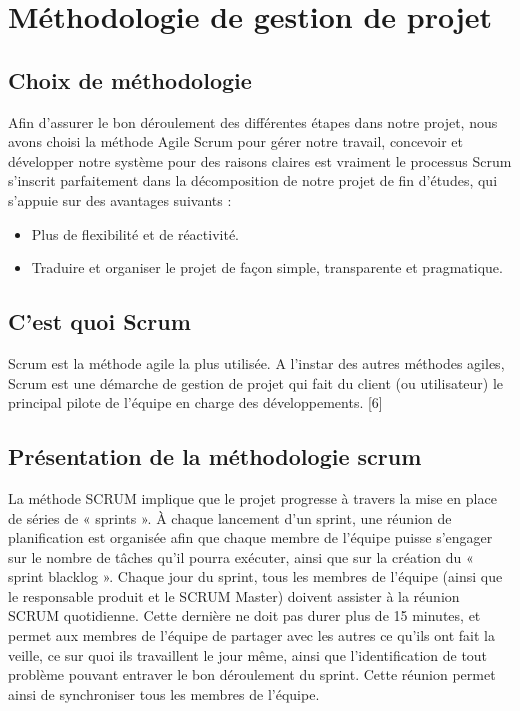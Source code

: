 	
	
	\section{Méthodologie de gestion de projet }
	\subsection{Choix de méthodologie }
	Afin d'assurer le bon déroulement des différentes étapes dans notre projet, nous avons choisi la méthode Agile Scrum pour gérer notre travail, concevoir et développer notre système pour des raisons claires est vraiment le processus Scrum s'inscrit parfaitement dans la décomposition de notre projet de fin d'études, qui s'appuie sur des avantages suivants :
	\begin{itemize}
		\item Plus de flexibilité et de réactivité.
		\item Traduire et organiser le projet de façon simple, transparente et pragmatique.
	\end{itemize}
	
	\subsection{C'est quoi Scrum }
	Scrum est la méthode agile la plus utilisée. A l'instar des autres méthodes agiles, Scrum est une démarche de gestion de projet qui fait du client (ou utilisateur) le principal pilote de l'équipe en charge des développements. [6]
	\subsection{Présentation de la méthodologie scrum }
	La méthode SCRUM implique que le projet progresse à travers la mise en place de séries de « sprints ». À chaque lancement d’un sprint, une réunion de planification est organisée afin que chaque membre de l’équipe puisse s’engager sur le nombre de tâches qu’il pourra exécuter, ainsi que sur la création du « sprint blacklog ».
	Chaque jour du sprint, tous les membres de l’équipe (ainsi que le responsable produit et le SCRUM Master) doivent assister à la réunion SCRUM quotidienne. Cette dernière ne doit pas durer plus de 15 minutes, et permet aux membres de l’équipe de partager avec les autres ce qu’ils ont fait la veille, ce sur quoi ils travaillent le jour même, ainsi que l’identification de tout problème pouvant entraver le bon déroulement du sprint. Cette réunion permet ainsi de synchroniser tous les membres de l’équipe.
	
